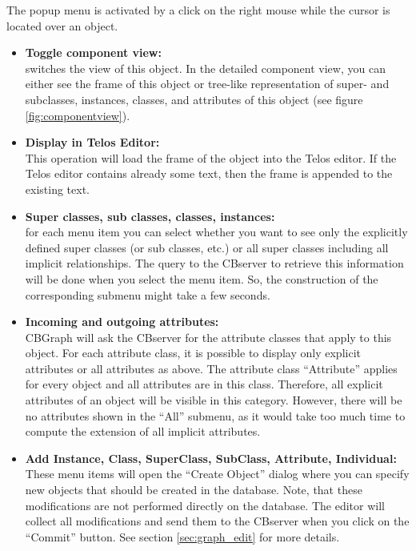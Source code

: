 The popup menu is activated by a click on the right mouse while the
cursor is located over an object.

\begin{itemize}
\item {\bf Toggle component view:} \\
	switches the view of this object. In the detailed component view,
	you can either see the frame of this object or tree-like
	representation of super- and subclasses, instances, classes, and
	attributes of this object (see figure \ref{fig:componentview}).
\item {\bf Display in Telos Editor:}\\
    This operation will load the frame of the object into the
    Telos editor. If the Telos editor contains already some text, then
    the frame is appended to the existing text.
\item {\bf Super classes, sub classes, classes, instances:}\\
    for each menu item you can select whether you want to
    see only the explicitly defined super classes (or sub classes, etc.)
    or all super classes including all implicit relationships.
    The query to the CBserver to retrieve this information
    will be done when you select the menu item. So, the construction
    of the corresponding submenu might take a few seconds.
\item {\bf Incoming and outgoing attributes:}\\
    CBGraph will ask the CBserver for the attribute
    classes that apply to this object. For each attribute class, it is
    possible to display only explicit attributes or all attributes as above.
    The attribute class ``Attribute'' applies for every object and all
    attributes are in this class. Therefore, all explicit attributes of
    an object will be visible in this category. However, there will be
    no attributes shown in the ``All'' submenu, as it would take too
    much time to compute the extension of all implicit attributes.
\item {\bf Add Instance, Class, SuperClass, SubClass, Attribute, Individual:}	\\
    These menu items will open the ``Create Object'' dialog where
    you can specify new objects that should be created in the database.
    Note, that these modifications are not performed directly on the
    database. The editor will collect all modifications and
    send them to the CBserver when you click on the ``Commit''
    button. See section \ref{sec:graph_edit} for more details.

\end{itemize}
